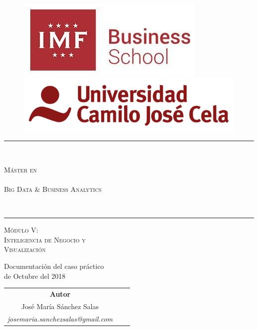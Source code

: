 \documentclass[a4paper,10pt,titlepage,oneside,openright]{book}
\begin{document}
\thispagestyle{empty}
\begin{figure}[h]
\includegraphics[scale=0.3]{logo-imf.png} \hspace{80mm}
\includegraphics[scale=0.25]{logo-ucjc.png}
\centering
\end{figure}

\vspace{5mm}

\begin{center}
\rule{150mm}{0.1mm} \\
\vspace{5mm}
\begin{Huge}
 \textsc{Máster en \\ ~ \\ Big Data \& Business Analytics}
\end{Huge}
\vspace{5mm} \\
\rule{150mm}{0.5mm}

\vspace{20mm}

\begin{huge}
  \textsc{Módulo V: \\ Inteligencia de Negocio y \\ Visualización} \\ \vspace{15mm}
\end{huge}

\begin{LARGE}
 Documentación del caso práctico\\ \vspace{5mm}
 {\large  de Octubre del 2018}
\end{LARGE}

\vspace{25mm}

\begin{Large}
\begin{center}
\begin{tabular}{ccc}
\textbf{Autor} \\
José María Sánchez Salas \\
\textit{josemaria.sanchezsalas@gmail.com}
\end{tabular}
\end{center}
\end{Large}
\end{center}
\newpage
\thispagestyle{empty}
\end{document}
